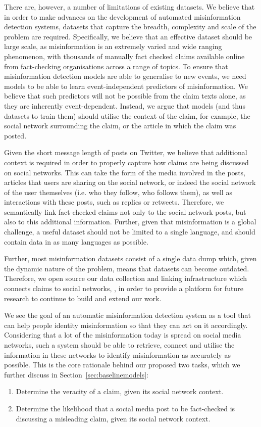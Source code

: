 \documentclass[sigconf,natbib=true,anonymous=false,nonacm]{acmart}
\begin{document}
There are, however, a number of limitations of existing datasets. We believe
that in order to make advances on the development of automated misinformation
detection systems, datasets that capture the breadth, complexity and scale of
the problem are required. Specifically, we believe that an effective dataset
should be large scale, as misinformation is an extremely varied and wide
ranging phenomenon, with thousands of manually fact checked claims available
online from fact-checking organisations across a range of topics. To ensure
that misinformation detection models are able to generalise to new events, we
need models to be able to learn event-independent predictors of misinformation.
We believe that such predictors will not be possible from the claim texts
alone, as they are inherently event-dependent. Instead, we argue that models
(and thus datasets to train them) should utilise the context of the claim, for
example, the social network surrounding the claim, or the article in which the
claim was posted.

Given the short message length of posts on Twitter, we believe that additional
context is required in order to properly capture how claims are being discussed
on social networks. This can take the form of the media involved in the posts,
articles that users are sharing on the social network, or indeed the social
network of the user themselves (i.e. who they follow, who follows them), as
well as interactions with these posts, such as replies or retweets. Therefore,
we semantically link fact-checked claims not only to the social network posts,
but also to this additional information. Further, given that misinformation is
a global challenge, a useful dataset should not be limited to a single
language, and should contain data in as many languages as possible.

Further, most misinformation datasets consist of a single data dump which,
given the dynamic nature of the problem, means that datasets can become
outdated. Therefore, we open source our data collection and linking
infrastructure which connects claims to social networks, \trawlname, in order
to provide a platform for future research to continue to build and extend our
work.

We see the goal of an automatic misinformation detection system as a tool that
can help people identity misinformation so that they can act on it accordingly.
Considering that a lot of the misinformation today is spread on social media
networks, such a system should be able to retrieve, connect and utilise the
information in these networks to identify misinformation as accurately as
possible. This is the core rationale behind our proposed two tasks, which we
further discuss in Section~\ref{sec:baselinemodels}:
\begin{enumerate}
    \item Determine the veracity of a claim, given its social network
        context.
    \item Determine the likelihood that a social media post to be
        fact-checked is discussing a misleading claim, given its social network
        context.
\end{enumerate}
\end{document}
